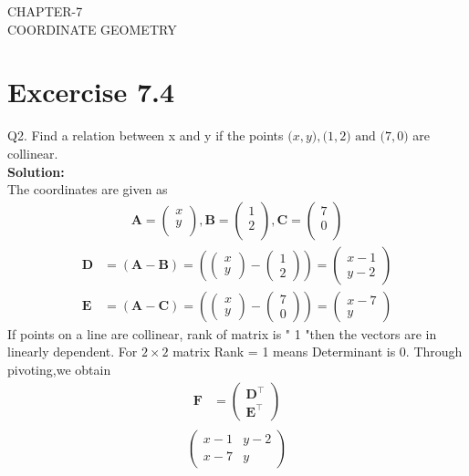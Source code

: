 \documentclass[12pt]{article}
\providecommand{\brak}[1]{\ensuremath{\left(#1\right)}}
\newcommand{\solution}{\noindent \textbf{Solution: }}
\newcommand{\myvec}[1]{\ensuremath{\begin{pmatrix}#1\end{pmatrix}}}
\let\vec\mathbf
\begin{document}
\begin{center}
\textbf\large{CHAPTER-7 \\ COORDINATE GEOMETRY}
\end{center}
\section*{Excercise 7.4}

Q2. Find a relation between x and y if the points $\vec(x, y), \vec(1, 2) \text{ and } \vec(7, 0)$ are collinear.
\\
\solution
\\
The coordinates are given as
	\begin{align}
	\vec{A} = \myvec{
		x\\
		y\\
		},
	\vec{B} = \myvec{
		1\\
		2\\
		},
	\vec{C} = \myvec{
		7\\
		0\\
		}
	\end{align}
	\begin{align}
\vec{D} &=\brak{\vec{A}-\vec{B}} = \brak{\myvec{x \\y } - \myvec{1 \\2 } } = \myvec{x-1 \\ y-2 }\\
\vec{E} &= \brak{\vec{A}-\vec{C}} = \brak{\myvec{x \\ y } - \myvec{7 \\0} } = \myvec{x-7 \\y}
\end{align}
 If points on a line  are  collinear, rank of matrix is " 1 "then the vectors are in linearly dependent.
For $2\times2$ matrix Rank = 1 means Determinant is 0.
Through pivoting,we obtain
\begin{align}
	\vec{F} &={\myvec{\vec{D}^{\top}\\ \vec{E}^{\top}}}
\end{align}
\begin{align}
\begin{split}
\myvec{
x-1 & y-2
 \\
x-7 & y 
}
\end{split}
\end{align}
\end{document}
